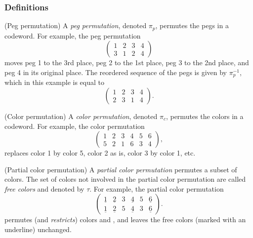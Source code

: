 \subsubsection{Definitions}

\begin{definition}
(Peg permutation) A \emph{peg permutation}, denoted $\pi_p$, permutes the pegs in a codeword. For example, the peg permutation
\[
\begin{pmatrix}
1 & 2 & 3 & 4 \\
3 & 1 & 2 & 4
\end{pmatrix} 
\]
moves peg 1 to the 3rd place, peg 2 to the 1st place, peg 3 to the 2nd place, and peg 4 in its original place. The reordered sequence of the pegs is given by $\pi_p^{-1}$, which in this example is equal to
\[
\begin{pmatrix}
1 & 2 & 3 & 4 \\
2 & 3 & 1 & 4
\end{pmatrix} .
\]
\end{definition}

\begin{definition}
(Color permutation) A \emph{color permutation}, denoted $\pi_c$, permutes the colors in a codeword. For example, the color permutation
\[
\begin{pmatrix}
1 & 2 & 3 & 4 & 5 & 6 \\
5 & 2 & 1 & 6 & 3 & 4
\end{pmatrix} ,
\]
replaces color 1 by color 5, color 2 as is, color 3 by color 1, etc.
\end{definition}

\begin{definition}
(Partial color permutation) A \emph{partial color permutation} permutes a subset of colors. The set of colors not involved in the partial color permutation are called \emph{free colors} and denoted by $\tau$.
For example, the partial color permutation
\[
\begin{pmatrix}
\underline{1} & \underline{2} & 3 & \underline{4} & 5 & \underline{6} \\
\underline{1} & \underline{2} & 5 & \underline{4} & 3 & \underline{6} 
\end{pmatrix} .
\]
permutes (and \emph{restricts}) colors  and , and leaves the free colors (marked with an underline) unchanged.
\end{definition}

